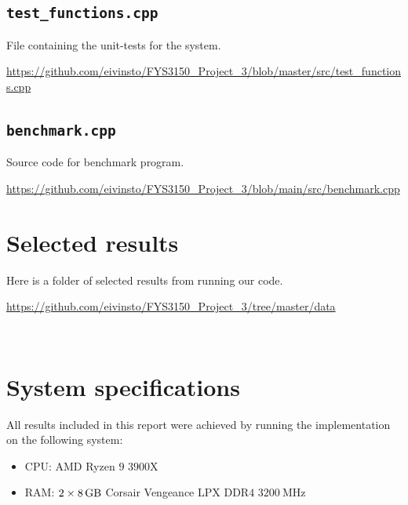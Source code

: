 \documentclass[reprint,english,notitlepage]{revtex4-1}  %
\begin{document}
\cprotect\subsection{\verb+test_functions.cpp+} \label{A.7}
File containing the unit-tests for the system.

\url{https://github.com/eivinsto/FYS3150_Project_3/blob/master/src/test_functions.cpp}

\cprotect\subsection{\verb+benchmark.cpp+} \label{A.8}
Source code for benchmark program.

\url{https://github.com/eivinsto/FYS3150_Project_3/blob/main/src/benchmark.cpp}

\newpage
\section{Selected results} \label{B}
Here is a folder of selected results from running our code.

\url{https://github.com/eivinsto/FYS3150_Project_3/tree/master/data}

~
\newpage
\section{System specifications} \label{C}
All results included in this report were achieved by running the implementation on the following system:

\begin{itemize}
	\item CPU: AMD Ryzen \(9\) \(3900\)X
	\item RAM: \(2\times\SI{8}{\giga\byte}\) Corsair Vengeance LPX DDR\(4\) \(\SI{3200}{\mega\hertz}\)
\end{itemize}
\end{document}
